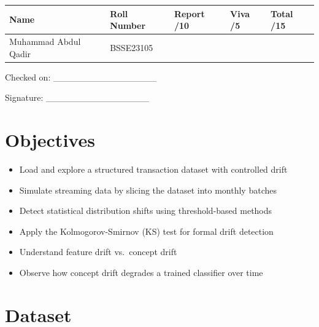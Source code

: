 \documentclass[12pt,a4paper]{article}
\begin{document}
\renewcommand{\arraystretch}{2.0}
\begin{tabularx}{\textwidth}{|Y|Y|Y|Y|Y|}
\hline
\textbf{Name} & \textbf{Roll Number} & \textbf{Report /10} & \textbf{Viva /5} & \textbf{Total /15} \\
\hline
Muhammad Abdul Qadir & BSSE23105 & & & \\
\hline
\end{tabularx}
\renewcommand{\arraystretch}{1.0}

\vspace{12pt}

\begin{flushright}
Checked on: \_\_\_\_\_\_\_\_\_\_\_\_\_\_\_\_

\vspace{6pt}
Signature: \_\_\_\_\_\_\_\_\_\_\_\_\_\_\_\_
\end{flushright}

\newpage


\section*{Objectives}

\begin{itemize}
\item Load and explore a structured transaction dataset with controlled drift
\item Simulate streaming data by slicing the dataset into monthly batches
\item Detect statistical distribution shifts using threshold-based methods
\item Apply the Kolmogorov-Smirnov (KS) test for formal drift detection
\item Understand feature drift vs.\ concept drift
\item Observe how concept drift degrades a trained classifier over time
\end{itemize}


\section*{Dataset}
\end{document}
